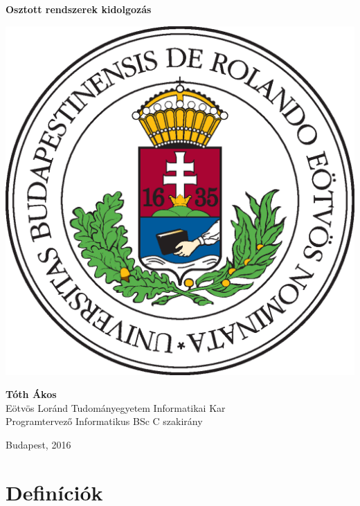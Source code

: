 \documentclass[twoside, a4paper, 12pt]{article}
\title{\DocTitle}
\author{\DocAuthor}
\date{\CurrentDate}
\def\DocTitle{Osztott rendszerek kidolgozás}
\def\DocAuthor{Tóth Ákos}
\def\CurrentDate{2016}
\begin{document}
\pagestyle{empty}
\begin{titlepage}
    \begin{center}
        \Huge
        \textbf{\DocTitle}
        \normalsize
    \end{center}
    \vfill
    \begin{center}
        \includegraphics[scale=1.0]{images/elte_cimer_szines.eps}
    \end{center}
    \vfill
    \begin{minipage}{1.0\linewidth}
        \begin{flushright}
            \textbf{\DocAuthor} \\
            Eötvös Loránd Tudományegyetem Informatikai Kar \\
            Programtervező Informatikus BSc C szakirány
        \end{flushright}
    \end{minipage}
    \vfill
    \begin{center}
        Budapest, \CurrentDate
    \end{center}
\end{titlepage}
\pagestyle{plain}
\setcounter{page}{1}
\section{Definíciók}
\end{document}
